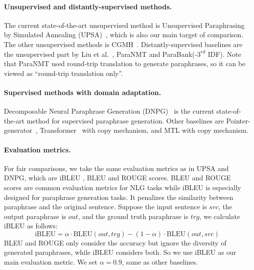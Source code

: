 \paragraph{Unsupervised and distantly-supervised methods. } The current state-of-the-art unsupervised method is Unsupervised Paraphrasing by Simulated Annealing (UPSA)~\cite{liu2019unsupervised}, which is also our main target of comparison. The other unsupervised methods is CGMH~\cite{miao2019cgmh}. 
Distantly-supervised baselines are the unsupervised part by 
Liu et al.~\cite{liu2020exploring}, ParaNMT and ParaBank(-$3^{rd}$ IDF). 
Note that ParaNMT used round-trip translation to generate paraphrases, 
so it can be viewed as ``round-trip translation only''.

\paragraph{Supervised methods with domain adaptation. } Decomposable Neural Paraphrase Generation (DNPG)~\cite{li2019decomposable} is the current 
state-of-the-art method for supervised paraphrase generation.
Other baselines are Pointer-generator~\cite{see2017get}, Transformer~\cite{vaswani2017attention} with copy mechanism, and MTL\cite{domhan2017using} with copy 
mechanism. 

\paragraph{Evaluation metrics. } For fair comparisons, 
we take the same evaluation metrics as in UPSA and 
DNPG, which are iBLEU \cite{sun2012joint}, BLEU \cite{papineni2002bleu} and ROUGE \cite{lin2004rouge} scores. 
BLEU and ROUGE scores are common evaluation metrics for NLG tasks while 
iBLEU is especially designed for paraphrase generation tasks. 
It penalizes the similarity between paraphrase and the original sentence. 
Suppose the input sentence is $src$, the output paraphrase is $out$, 
and the ground truth paraphrase is $trg$, we calculate iBLEU as follows:
\begin{equation}
\text{iBLEU} = \alpha \cdot \text{BLEU}(out, trg) - (1-\alpha) \cdot 
\text{BLEU}(out, src)\label{equ:ibleu}
\end{equation}
BLEU and ROUGE only consider the accuracy but ignore the 
diversity of generated paraphrases, while iBLEU considers both. 
So we use iBLEU as our main evaluation metric.
We set $\alpha=0.9$, same as other baselines.

